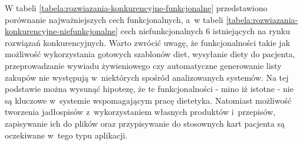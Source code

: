 W tabeli \ref{tabela:rozwiazania-konkurencyjne-funkcjonalne} przedstawiono porównanie najważniejszych cech funkcjonalnych, a~w tabeli \ref{tabela:rozwiazania-konkurencyjne-niefunkcjonalne} cech niefunkcjonalnych 6 istniejących na rynku rozwiązań konkurencyjnych\cite{url:porownanie-programow-dietetycznych}.
Warto zwrócić uwagę, że funkcjonalności takie jak możliwość wykorzystania gotowych szablonów diet, wysyłanie diety do pacjenta, przeprowadzanie wywiadu żywieniowego czy automatyczne generowanie listy zakupów nie występują w~niektórych spośród analizowanych systemów.
Na tej podstawie można wysunąć hipotezę, że te funkcjonalności - mino iż istotne - nie są kluczowe w~systemie wspomagającym pracę dietetyka.
Natomiast możliwość tworzenia jadłospisów z~wykorzystaniem własnych produktów i~przepisów, zapisywanie ich do plików oraz przypisywanie do stosownych kart pacjenta są oczekiwane w~tego typu aplikacji.

